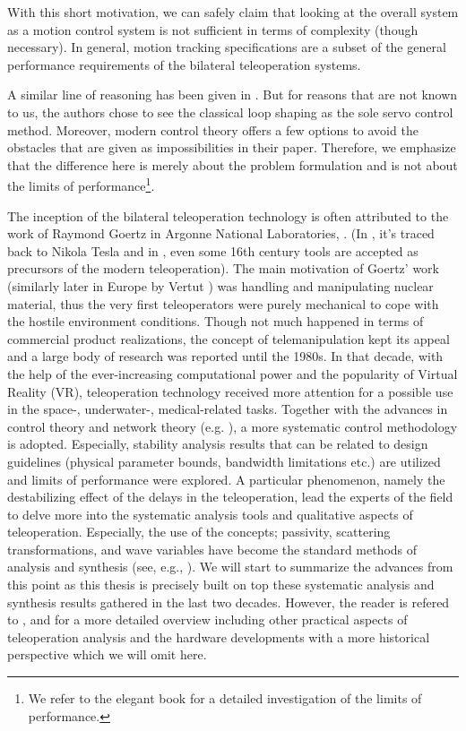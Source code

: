 With this short motivation, we can safely claim that looking at the overall system as a motion control 
system is not sufficient in terms of complexity (though necessary). In general, motion tracking specifications 
are a subset of the general performance requirements of the bilateral teleoperation systems. 

\begin{rem}
A similar line of reasoning has been given in \cite{buergerhogan1}. But for reasons that are 
not known to us,  the authors chose to see the classical loop shaping as the sole servo control method. Moreover, modern 
control theory offers a few options to avoid the obstacles that are given as impossibilities in their paper. Therefore, 
we emphasize that the difference here is merely about the problem formulation and is not about the 
limits of performance\footnote{We refer to the elegant book \cite{boydbarratt} for a detailed investigation of the 
limits of performance.}. 
\end{rem}


The inception of the bilateral teleoperation technology is often attributed to the work 
of Raymond Goertz in Argonne National Laboratories, \cite{goertz}. (In \cite{basanezsuarez}, 
it's traced back to Nikola Tesla and in \cite{sheridan89}, even some 16th century tools are accepted as precursors 
of the modern teleoperation). The main motivation of Goertz' work (similarly later in Europe 
by Vertut \cite{vertutcoiffet}) was handling and manipulating nuclear material, thus the very 
first teleoperators were purely mechanical to cope with the hostile environment conditions. Though not much 
happened in terms of commercial product realizations, the concept of telemanipulation kept its appeal 
and a large body of research was reported until the 1980s. In that decade, with the help of the 
ever-increasing computational power and the popularity of Virtual Reality (VR), teleoperation 
technology received more attention for a possible use in the space-, underwater-, medical-related 
tasks. Together with the advances in control theory and network theory (e.g. \cite{miyazaki,furuta}), 
a more systematic control methodology is adopted. Especially, stability analysis results that can be 
related to design guidelines (physical parameter bounds, bandwidth limitations etc.) are utilized
and limits of performance were explored. A particular phenomenon, namely the destabilizing effect 
of the delays in the teleoperation, lead the experts of the field to delve more into the systematic 
analysis tools and qualitative aspects of teleoperation. Especially, the use of the concepts; passivity, 
scattering transformations, and wave variables have become the standard methods of analysis and synthesis
(see, e.g., \cite{hannaford89,andersonspong,nieslotine}). We will start to summarize the advances from this 
point as this thesis is precisely built on top these systematic analysis and synthesis results gathered in 
the last two decades. However, the reader is refered to \cite{hokayemspong,burdea}, 
and \cite{sheridan89} for a more detailed overview including other practical aspects of teleoperation analysis and 
the hardware developments with a more historical perspective which we will omit here. 


